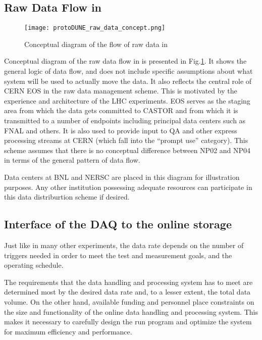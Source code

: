 \subsection{Raw Data Flow in \pd}
\label{sec:raw_concept}
\begin{figure}[tbh]
\centering\texttt{[image: protoDUNE\_raw\_data\_concept.png]}
\caption{\label{fig:raw_concept}Conceptual diagram of the flow of raw data in \pd}
\end{figure}

\noindent
Conceptual diagram of the raw data flow in \pd is presented in Fig.\ref{fig:raw_concept}. It shows the general logic
of data flow, and does not include specific assumptions about what system will be used to actually move the data.
It also reflects the central role of CERN EOS in the \pd raw data management scheme. This is motivated by the experience
and architecture of the LHC experiments. EOS serves as the staging area from which the data gets committed to CASTOR
and from which it is transmitted to a number of endpoints including principal data centers such as FNAL and others.
It is also used to provide input to QA and other express processing streams at CERN (which fall into the ``prompt use'' category).
This scheme assumes that there is no conceptual difference between NP02 and NP04 in terms of the general pattern of data flow.

Data centers at BNL and NERSC are placed in this diagram for illustration purposes. Any other institution possessing adequate
resources can participate in this data distriburtion scheme if desired.

\subsection{Interface of the DAQ to the online storage}
Just like in many other experiments, the \pd data rate depends on the number of
triggers needed in order to meet the test and measurement goals, and
the operating schedule.

The requirements that the data handling and processing system has to meet are
determined most  by the desired data rate and, to a lesser extent, the total data volume.
On the other hand, available funding and personnel place
constraints on the size and functionality of the online data handling
and processing system. This makes it necessary to carefully design
the run program and optimize the system for maximum efficiency and
performance.


